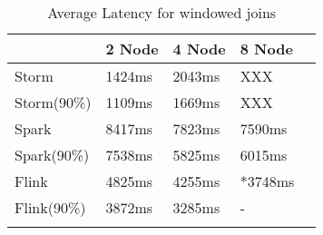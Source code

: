     \begin{table}
        \begin{tabular}{lllll}\toprule
            &\textbf{2 Node}  & \textbf{4 Node} & \textbf{8 Node}\\\midrule
            Storm & 1424ms & 2043ms & XXX \\
            Storm(90\%) & 1109ms & 1669ms & XXX \\
            Spark & 8417ms & 7823ms & 7590ms\\
            Spark(90\%) & 7538ms & 5825ms & 6015ms\\
            Flink & 4825ms & 4255ms & *3748ms \\
            Flink(90\%) & 3872ms & 3285ms  & - \\
            \\\bottomrule
        \end{tabular}
        \caption{Average Latency for windowed joins}\label{Tab1}
    \end{table} 
